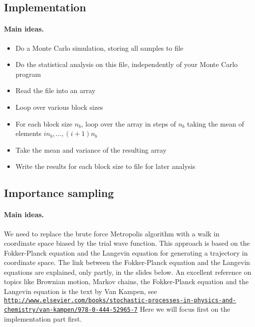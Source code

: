 \documentclass[%
twoside,                 %
final,                   %
10pt]{article}
\begin{document}
\noindent



\subsection{Implementation}

\paragraph{Main ideas.}
\begin{itemize}
    \item Do a Monte Carlo simulation, storing all samples to file

    \item Do the statistical analysis on this file, independently of your Monte Carlo program

    \item Read the file into an array

    \item Loop over various block sizes

    \item For each block size $n_b$, loop over the array in steps of $n_b$ taking the mean of elements $i n_b,\ldots,(i+1) n_b$

    \item Take the mean and variance of the resulting array

    \item Write the results for each block size to file for later
      analysis
\end{itemize}

\noindent





\subsection{Importance sampling}

\paragraph{Main ideas.}
We need to replace the brute force
Metropolis algorithm with a walk in coordinate space biased by the trial wave function.
This approach is based on the Fokker-Planck equation and the Langevin equation for generating a trajectory in coordinate space.  The link between the Fokker-Planck equation and the Langevin equations are explained, only partly, in the slides below.
An excellent reference on topics like Brownian motion, Markov chains, the Fokker-Planck equation and the Langevin equation is the text by  Van Kampen, see \href{{http://www.elsevier.com/books/stochastic-processes-in-physics-and-chemistry/van-kampen/978-0-444-52965-7}}{\nolinkurl{http://www.elsevier.com/books/stochastic-processes-in-physics-and-chemistry/van-kampen/978-0-444-52965-7}}
Here we will focus first on the implementation part first.
\end{document}

